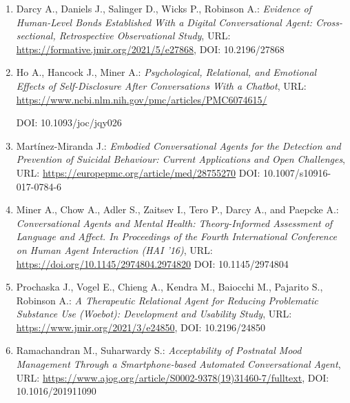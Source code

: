 \documentclass[11pt]{article}
\begin{document}
\begin{enumerate}

\item Darcy A., Daniels J., Salinger D., Wicks P., Robinson A.:
\textit{Evidence of Human-Level Bonds Established With a Digital Conversational Agent: Cross-sectional, Retrospective Observational Study},
URL: \url{https://formative.jmir.org/2021/5/e27868},
DOI: 10.2196/27868

\item Ho A., Hancock J., Miner A.:
\textit{Psychological, Relational, and Emotional Effects of
Self-Disclosure After Conversations With a Chatbot},
URL: \url{https://www.ncbi.nlm.nih.gov/pmc/articles/PMC6074615/}

DOI: 10.1093/joc/jqy026

\item Martínez-Miranda J.: 
\textit{Embodied Conversational Agents for the Detection and 
Prevention of Suicidal Behaviour: 
Current Applications and Open Challenges},
URL: \url{https://europepmc.org/article/med/28755270}
DOI: 10.1007/s10916-017-0784-6

\item Miner A., Chow A., Adler S., Zaitsev I., Tero P., Darcy A., and Paepcke A.:
\textit{Conversational Agents and Mental Health: Theory-Informed Assessment of Language and
Affect. In Proceedings of the Fourth International Conference on Human Agent Interaction (HAI
'16)},
URL: \url{https://doi.org/10.1145/2974804.2974820}
DOI: 10.1145/2974804

\item Prochaska J., Vogel E., Chieng A., Kendra M., Baiocchi M., Pajarito S., Robinson A.:
\textit{A Therapeutic Relational Agent for Reducing Problematic Substance Use (Woebot): Development and Usability Study}, 
URL: \url{https://www.jmir.org/2021/3/e24850},
DOI: 10.2196/24850

\item Ramachandran M., Suharwardy S.: \textit{Acceptability of Postnatal Mood Management Through a Smartphone-based
Automated Conversational Agent},
URL: \url{https://www.ajog.org/article/S0002-9378(19)31460-7/fulltext},
DOI: 10.1016/201911090
\end{enumerate}
\end{document}
